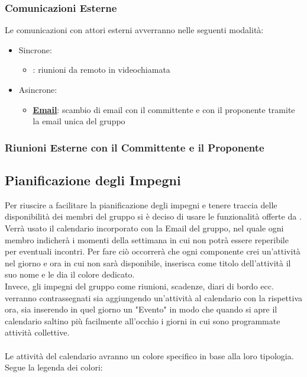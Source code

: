 \documentclass[a4paper,12pt]{article}
\begin{document}


\subsubsection{Comunicazioni Esterne}
Le comunicazioni con attori esterni avverranno nelle seguenti modalità:
\begin{itemize}
    \item Sincrone:
        \begin{itemize}
            \item \textbf{\underline{}}: riunioni da remoto in videochiamata 
        \end{itemize}
    \item Asincrone:
        \begin{itemize}
            \item \textbf{\underline{\hyperref[strumenti:gmail]{Email}}}: scambio di email con il committente e con il proponente tramite la email unica del gruppo
        \end{itemize}
\end{itemize}

\subsubsection{Riunioni Esterne con il Committente e il Proponente}



\subsection{Pianificazione degli Impegni} \label{sec:pianificazioneImpegni}
Per riuscire a facilitare la pianificazione degli impegni e tenere traccia delle disponibilità dei membri del gruppo si è deciso di usare le funzionalità offerte da \textbf{\underline{}}. Verrà usato il calendario incorporato con la Email del gruppo, nel quale ogni membro indicherà i momenti della settimana in cui non potrà essere reperibile per eventuali incontri. Per fare ciò occorrerà che ogni componente crei un'attività nel giorno e ora in cui non sarà disponibile, inserisca come titolo dell'attività il suo nome e le dia il colore dedicato.
\\ Invece, gli impegni del gruppo come riunioni, scadenze, diari di bordo ecc. verranno contrassegnati sia aggiungendo un'attività al calendario con la rispettiva ora, sia inserendo in quel giorno un "Evento" in modo che quando si apre il calendario saltino più facilmente all'occhio i giorni in cui sono programmate attività collettive.\\\\
Le attività del calendario avranno un colore specifico in base alla loro tipologia.
Segue la legenda dei colori:
\end{document}
